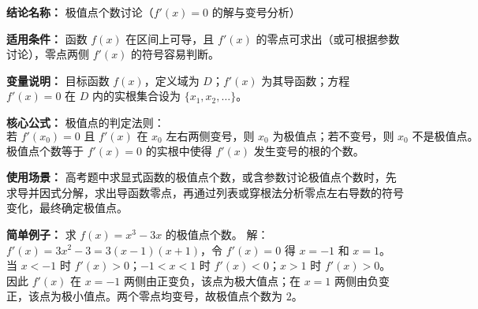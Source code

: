 \textbf{结论名称：} 极值点个数讨论（\(f'(x)=0\) 的解与变号分析）

\textbf{适用条件：} 函数 \(f(x)\) 在区间上可导，且 \(f'(x)\) 的零点可求出（或可根据参数讨论），零点两侧 \(f'(x)\) 的符号容易判断。

\textbf{变量说明：} 目标函数 \(f(x)\)，定义域为 \(D\)；\(f'(x)\) 为其导函数；方程 \(f'(x)=0\) 在 \(D\) 内的实根集合设为 \(\{x_1,x_2,\dots\}\)。

\textbf{核心公式：} 极值点的判定法则：
\[
\boxed{\text{若 } f'(x_0)=0 \text{ 且 } f'(x) \text{ 在 } x_0 \text{ 左右两侧变号，则 } x_0 \text{ 为极值点；若不变号，则 } x_0 \text{ 不是极值点。}}
\]
极值点个数等于 \(f'(x)=0\) 的实根中使得 \(f'(x)\) 发生变号的根的个数。

\textbf{使用场景：} 高考题中求显式函数的极值点个数，或含参数讨论极值点个数时，先求导并因式分解，求出导函数零点，再通过列表或穿根法分析零点左右导数的符号变化，最终确定极值点。

\textbf{简单例子：} 求 \(f(x)=x^{3}-3x\) 的极值点个数。
解：\(f'(x)=3x^{2}-3=3(x-1)(x+1)\)，令 \(f'(x)=0\) 得 \(x=-1\) 和 \(x=1\)。
当 \(x<-1\) 时 \(f'(x)>0\)；\(-1<x<1\) 时 \(f'(x)<0\)；\(x>1\) 时 \(f'(x)>0\)。
因此 \(f'(x)\) 在 \(x=-1\) 两侧由正变负，该点为极大值点；在 \(x=1\) 两侧由负变正，该点为极小值点。两个零点均变号，故极值点个数为 \(2\)。